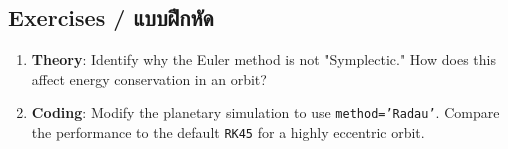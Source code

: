 \subsection{Exercises \quad / \quad \textthai{แบบฝึกหัด}}
\begin{enumerate}
    \item \textbf{Theory}: Identify why the Euler method is not "Symplectic." How does this affect energy conservation in an orbit?
    \item \textbf{Coding}: Modify the planetary simulation to use \texttt{method='Radau'}. Compare the performance to the default \texttt{RK45} for a highly eccentric orbit.
\end{enumerate}
